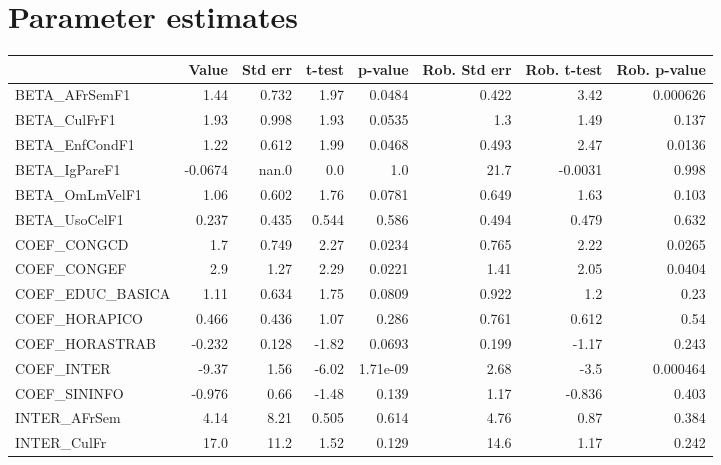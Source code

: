 \section{Parameter estimates}
\begin{tabular}{lrrrrrrr}
\toprule
{} &   Value &  Std err &  t-test &  p-value &  Rob. Std err &  Rob. t-test &  Rob. p-value \\
\midrule
BETA\_AFrSemF1      &    1.44 &    0.732 &    1.97 &   0.0484 &         0.422 &         3.42 &      0.000626 \\
BETA\_CulFrF1       &    1.93 &    0.998 &    1.93 &   0.0535 &           1.3 &         1.49 &         0.137 \\
BETA\_EnfCondF1     &    1.22 &    0.612 &    1.99 &   0.0468 &         0.493 &         2.47 &        0.0136 \\
BETA\_IgPareF1      & -0.0674 &    nan.0 &     0.0 &      1.0 &          21.7 &      -0.0031 &         0.998 \\
BETA\_OmLmVelF1     &    1.06 &    0.602 &    1.76 &   0.0781 &         0.649 &         1.63 &         0.103 \\
BETA\_UsoCelF1      &   0.237 &    0.435 &   0.544 &    0.586 &         0.494 &        0.479 &         0.632 \\
COEF\_CONGCD        &     1.7 &    0.749 &    2.27 &   0.0234 &         0.765 &         2.22 &        0.0265 \\
COEF\_CONGEF        &     2.9 &     1.27 &    2.29 &   0.0221 &          1.41 &         2.05 &        0.0404 \\
COEF\_EDUC\_BASICA   &    1.11 &    0.634 &    1.75 &   0.0809 &         0.922 &          1.2 &          0.23 \\
COEF\_HORAPICO      &   0.466 &    0.436 &    1.07 &    0.286 &         0.761 &        0.612 &          0.54 \\
COEF\_HORASTRAB     &  -0.232 &    0.128 &   -1.82 &   0.0693 &         0.199 &        -1.17 &         0.243 \\
COEF\_INTER         &   -9.37 &     1.56 &   -6.02 & 1.71e-09 &          2.68 &         -3.5 &      0.000464 \\
COEF\_SININFO       &  -0.976 &     0.66 &   -1.48 &    0.139 &          1.17 &       -0.836 &         0.403 \\
INTER\_AFrSem       &    4.14 &     8.21 &   0.505 &    0.614 &          4.76 &         0.87 &         0.384 \\
INTER\_CulFr        &    17.0 &     11.2 &    1.52 &    0.129 &          14.6 &         1.17 &         0.242 \\

\end{tabular}
